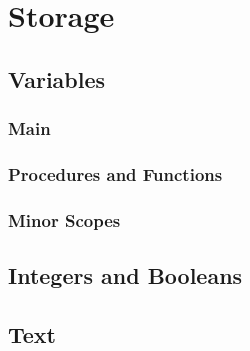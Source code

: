 \section{Storage}
\subsection{Variables}
\subsubsection{Main}
\subsubsection{Procedures and Functions}
\subsubsection{Minor Scopes}
\subsection{Integers and Booleans}
\subsection{Text}
